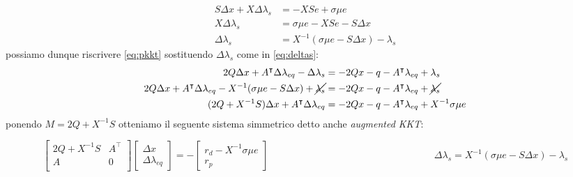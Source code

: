 \begin{equation} \label{eq:deltas}
\begin{split}
    S\Delta x + X \Delta \lambda_s &= -XSe + \sigma \mu e\\
    X \Delta \lambda_s &=\sigma \mu e -XSe -S\Delta x\\
    \Delta \lambda_s &= X^{-1}(\sigma \mu e - S\Delta x) - \lambda_s
\end{split}
\end{equation}
possiamo dunque riscrivere \ref{eq:pkkt} sostituendo $\Delta \lambda_s$ come in \ref{eq:deltas}:
\begin{equation}\label{eq:deltax}
    \begin{split}
        2Q\Delta x + A^\intercal \Delta \lambda_{eq} - \Delta \lambda_s &= -2Qx-q-A^\intercal \lambda_{eq} +\lambda_s\\
        2Q\Delta x + A^\intercal \Delta \lambda_{eq} - X^{-1}(\sigma \mu e - S\Delta x) + \cancel{\lambda_s} &= -2Qx-q-A^\intercal \lambda_{eq} + \cancel{\lambda_s}\\
        (2Q +X^{-1}S)\Delta x + A^\intercal \Delta \lambda_{eq} &= -2Qx -q -A^\intercal \lambda_{eq} + X^{-1} \sigma \mu e
    \end{split}
\end{equation}
ponendo $M=2Q + X^{-1}S$ otteniamo il seguente sistema simmetrico detto anche \emph{augmented KKT}:

\begin{subequations}\label{eq:aguKKT}
\begin{equation} \label{eq:pkkt2}
\begin{bmatrix}
2Q +X^{-1}S & A^\intercal\\
A & 0 \\
\end{bmatrix}\begin{bmatrix}\Delta x \\ \Delta \lambda_{eq}\end{bmatrix}= -
\begin{bmatrix}
    r_d-X^{-1}\sigma \mu e\\r_p
\end{bmatrix}
\end{equation}
\begin{equation} \label{eq:dds}
\;\;\;\;\;\;\;\;\;\;\;\;\;\;\;\;\;\;\;\;\;\;\;\;\;\;\;\;\;\;\;\;\;\;\;\;\;\;\;\;\;\;\;\;\;\;\;\;\;\;\;\;\;\;\;\;\;\;\;\;\;\Delta \lambda_s = X^{-1}(\sigma \mu e - S\Delta x) - \lambda_s
\end{equation}
\end{subequations}

